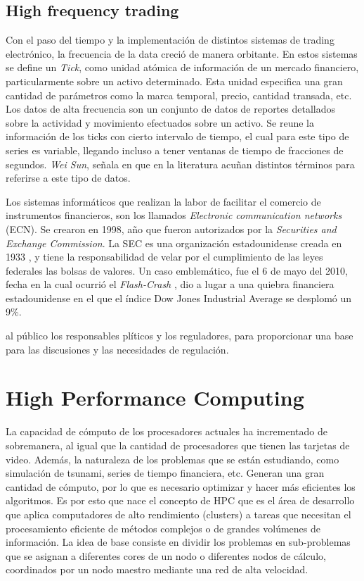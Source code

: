 \subsection{High frequency trading}

Con el paso del tiempo y la implementación de distintos sistemas de trading electrónico, la frecuencia de la data creció de manera
orbitante. En estos sistemas se define un \emph{Tick}, como unidad atómica de información de un mercado financiero, particularmente sobre un activo determinado.
Esta unidad especifica una gran cantidad de parámetros como la marca temporal, precio, cantidad transada, etc. Los datos de alta frecuencia son un conjunto de datos 
de reportes detallados sobre la actividad y movimiento efectuados sobre un activo. Se reune la información de los ticks con cierto intervalo de tiempo, 
el cual para este tipo de series es variable, llegando incluso a tener ventanas de tiempo de fracciones de segundos. \emph{Wei Sun}, señala en \cite{ei2007quantitative}
que en la literatura acuñan distintos términos para referirse a este tipo de datos.

Los sistemas informáticos que realizan la labor de facilitar el comercio de instrumentos financieros, son los llamados \emph{Electronic communication networks} (ECN).
Se crearon en 1998, año que fueron autorizados por la \emph{Securities and Exchange Commission}. La SEC es una organización estadounidense creada en 1933 \cite{hasbrouck2004economic}, 
y tiene la responsabilidad de velar por el cumplimiento de las leyes federales las bolsas de valores. Un caso emblemático, fue el 6 de mayo del 2010, fecha en la cual ocurrió el 
\emph{Flash-Crash} \cite{arndt2011high}, dio a lugar a una quiebra financiera estadounidense en el que el índice Dow Jones Industrial Average se desplomó un 9\%.

al público los responsables plíticos y los reguladores, para proporcionar una base para las discusiones y las necesidades de regulación.


\section{High Performance Computing}

La capacidad de cómputo de los procesadores actuales ha incrementado de sobremanera, al igual que la cantidad de procesadores que tienen las tarjetas de video. Además, la
naturaleza de los problemas que se están estudiando, como simulación de tsunami, series de tiempo financiera, etc. Generan una gran cantidad de cómputo, por lo que es
necesario optimizar y hacer más eficientes los algoritmos. Es por esto que nace el concepto de HPC que es el área de desarrollo que aplica computadores de alto rendimiento 
(clusters) a tareas que necesitan el procesamiento eficiente de métodos complejos o de grandes volúmenes de información. La idea de base consiste en dividir los problemas 
en sub-problemas que se asignan a diferentes cores de un nodo o diferentes nodos de cálculo, coordinados por un nodo maestro mediante una red de alta velocidad. 

